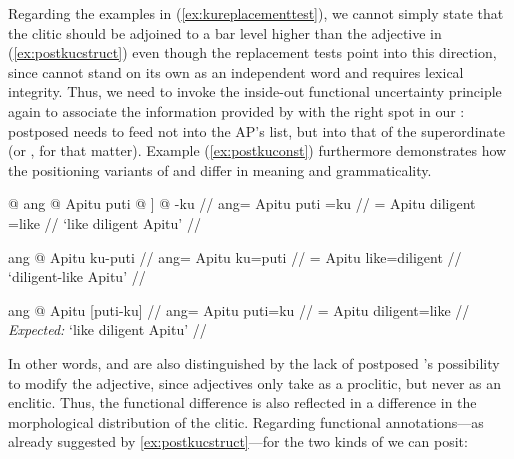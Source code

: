 Regarding the examples in (\ref{ex:kureplacementtest}), we cannot simply state
that the clitic should be adjoined to a bar level higher than the adjective in
(\ref{ex:postkucstruct}) even though the replacement tests point into this
direction, since  cannot stand on its own as an independent word
and \Lfg{} requires lexical integrity. Thus, we need to invoke the inside-out
functional uncertainty principle again to associate the information provided by
 with the right spot in our \Avm{}: postposed 
needs to feed not into the AP's \Adjc{} list, but into that of the
superordinate \GF{} (or \DF{}, for that matter). Example (\ref{ex:postkuconst})
furthermore demonstrates how the positioning variants of  and
 differ in meaning and grammaticality.

\pex\label{ex:postkuconst}
\a\label{ex:postkuconst1}\begingl
	\gla {\normalfont [} @ ang @ Apitu puti @ {\normalfont ]} @ -ku //
	\glb {} ang= Apitu puti {} =ku //
	\glc {} \Aarg{}= Apitu diligent {} =like //
	\glft `like diligent Apitu' //
\endgl

\a\label{ex:postkuconst2}\begingl
	\gla ang @ Apitu ku-puti //
	\glb ang= Apitu ku=puti //
	\glc \Aarg{}= Apitu like=diligent //
	\glft `diligent-like Apitu' //
\endgl

\a\ljudge*\label{ex:postkuconst3}\begingl
	\gla ang @ Apitu {\normalfont [}puti-ku{\normalfont ]} //
	\glb ang= Apitu puti=ku //
	\glc \Aarg{}= Apitu diligent=like //
	\glft \textit{Expected:} `like diligent Apitu' //
\endgl

\xe

In other words,  and  are also
distinguished by the lack of postposed 's possibility to modify
the adjective, since adjectives only take  as a proclitic, but
never as an enclitic. Thus, the functional difference is also reflected in a
difference in the morphological distribution of the clitic. Regarding
functional annotations---as already suggested by 
\autoref{ex:postkucstruct}---for the two kinds of  we can posit:

\begin{morphlex}
\pex\label{ex:kumorphlex}%
\a\label{ex:prekumorphlex}

\a\label{ex:postkumorphlex}
\xe
\end{morphlex}

